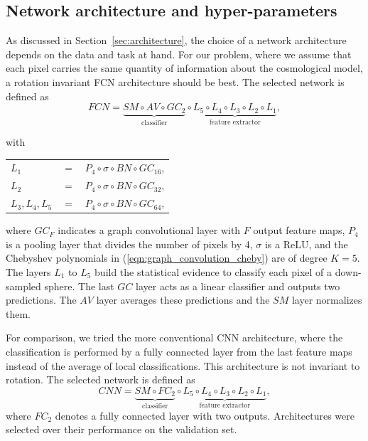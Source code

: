 \documentclass[final,twocolumn,3p,times,sort&compress]{elsarticle}
\newcommand{\secref}[1]{Section~\ref{sec:#1}}
\newcommand{\eqnref}[1]{(\ref{eqn:#1})}
\newcommand{\1}{\b{1}}              %
\newcommand{\0}{\b{0}}              %
\begin{document}
\subsection{Network architecture and hyper-parameters}
\label{sec:hyper_parameters}

As discussed in \secref{architecture}, the choice of a network architecture depends on the data and task at hand.
For our problem, where we assume that each pixel carries the same quantity of information about the cosmological model, a rotation invariant FCN architecture should be best.
The selected network is defined as
\begin{equation*}
	FCN = \underbrace{SM \circ AV \circ GC_2}_{\text{classifier}} \circ \underbrace{L_5 \circ L_4 \circ L_3 \circ L_2 \circ L_1}_{\text{feature extractor}},
\end{equation*}
\begin{center}
with \hspace{0.5cm} \begin{tabular}{lll}
   $L_1$ &  $=$ &$ P_4 \circ \sigma \circ BN \circ GC_{16}$, \\
   $L_2$ &  $=$ &$ P_4 \circ \sigma \circ BN \circ GC_{32}$, \\
   $L_3,L_4,L_5$ & $=$ &$ P_4 \circ \sigma \circ BN \circ GC_{64}$, \\
\end{tabular}
\end{center}
where $GC_F$ indicates a graph convolutional layer with $F$ output feature maps, $P_4$ is a pooling layer that divides the number of pixels by 4, $\sigma$ is a ReLU, and the Chebyshev polynomials in \eqnref{graph_convolution_cheby} are of degree $K=5$.
The layers $L_1$ to $L_5$ build the statistical evidence to classify each pixel of a down-sampled sphere.
The last $GC$ layer acts as a linear classifier and outputs two predictions.
The $AV$ layer averages these predictions and the $SM$ layer normalizes them.

For comparison, we tried the more conventional CNN architecture, where the classification is performed by a fully connected layer from the last feature maps instead of the average of local classifications. This architecture is not invariant to rotation. The selected network is defined as
\begin{equation*}
	CNN = \underbrace{SM \circ FC_2}_{\text{classifier}} \circ \underbrace{L_5 \circ L_4 \circ L_3 \circ L_2 \circ L_1}_{\text{feature extractor}},
\end{equation*}
where $FC_2$ denotes a fully connected layer with two outputs.
Architectures were selected over their performance on the validation set.
\end{document}
